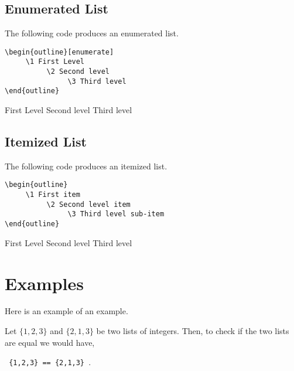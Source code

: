  \subsection{Enumerated List}
 The following code produces an enumerated list.
 
\begin{verbatim}
\begin{outline}[enumerate]
     \1 First Level
          \2 Second level
               \3 Third level
\end{outline}
 \end{verbatim}
 
 \begin{outline}[enumerate]
 	\1 First Level
		\2 Second level
			\3 Third level
\end{outline}
 
 
 
 \subsection{Itemized List}
 The following code produces an itemized list.
 
\begin{verbatim}
\begin{outline}
     \1 First item
          \2 Second level item
               \3 Third level sub-item
\end{outline}
 \end{verbatim}
 
 \begin{outline}
 	\1 First Level
		\2 Second level
			\3 Third level
\end{outline}









\section{Examples}\label{ex:x1}
Here is an example of an example.


\begin{example}
Let  $\{1,2,3\}$ and $\{2,1,3\}$ be two lists of integers.  Then, to check if the two lists are equal we would have,   
	\begin{center}
		\texttt{ \{1,2,3\} == \{2,1,3\} }.
	\end{center}\label{ex:equallists}
\end{example}


